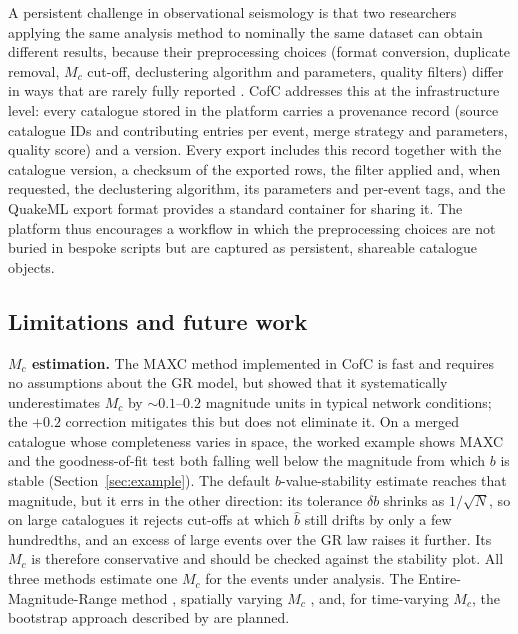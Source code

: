 \documentclass[12pt]{article}
\begin{document}
A persistent challenge in observational seismology is that two researchers
applying the same analysis method to nominally the same dataset can obtain
different results, because their preprocessing choices (format conversion,
duplicate removal, $M_c$ cut-off, declustering algorithm and parameters,
quality filters) differ in ways that are rarely fully reported
\citep{schorlemmer2007}.  CofC addresses this at the infrastructure
level: every catalogue stored in the platform carries a provenance record
(source catalogue IDs and contributing entries per event, merge strategy and
parameters, quality score) and a version.  Every export includes this record
together with the catalogue version, a checksum of the exported rows, the filter
applied and, when requested, the declustering algorithm, its parameters and
per-event tags, and the QuakeML export format \citep{schorlemmer2011} provides a
standard container for sharing it.  The platform thus encourages a
workflow in which the preprocessing choices are not buried in bespoke scripts
but are captured as persistent, shareable catalogue objects.

\subsection{Limitations and future work}

\textbf{$M_c$ estimation.}  The MAXC method \citep{wiemer2000} implemented in
CofC is fast and requires no assumptions about the GR model, but
\citet{woessner2005} showed that it systematically underestimates $M_c$ by
$\sim 0.1$--$0.2$ magnitude units in typical network conditions; the $+0.2$
correction mitigates this but does not eliminate it.  On a merged catalogue whose
completeness varies in space, the worked example shows MAXC and the
goodness-of-fit test both falling well below the magnitude from which $b$ is
stable (Section~\ref{sec:example}).  The default $b$-value-stability estimate
\citep{caogao2002,woessner2005} reaches that magnitude, but it errs in the
other direction: its tolerance $\delta b$ shrinks as $1/\sqrt{N}$, so on large
catalogues it rejects cut-offs at which $\hat{b}$ still drifts by only a few
hundredths, and an excess of large events over the GR law raises it further.
Its $M_c$ is therefore conservative and should be checked against the
stability plot.  All three methods estimate one $M_c$ for
the events under analysis.  The Entire-Magnitude-Range method
\citep{woessner2005}, spatially varying $M_c$ \citep{schorlemmer2008}, and, for
time-varying $M_c$, the bootstrap approach described by \citet{mignan2012} are
planned.
\end{document}
